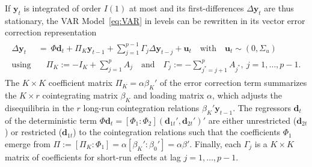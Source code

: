 If $ \boldsymbol{y}_{t} $ is integrated of order $ I(1) $ at most and its first-differences $ \Delta \boldsymbol{y}_{t} $ are thus stationary, the VAR Model~\eqref{eq:VAR} in levels can be rewritten in its vector error correction representation
\begin{align} \label{eq:VECM}
\begin{split}
	\Delta \boldsymbol{y}_{t} \ & = \ \Phi \boldsymbol{d}_{t} + \Pi_{K} \boldsymbol{y}_{t-1} + \sum_{j=1}^{p-1} \Gamma_{j} \Delta \boldsymbol{y}_{t-j} + \boldsymbol{u}_{t} \quad \textrm{with} \quad \boldsymbol{u}_{t} \sim (0,\Sigma_u)
	\\ \textrm{using} & \quad \Pi_{K} := -I_K+\sum_{j=1}^{p} A_j \quad \textrm{and} \quad \Gamma_j := -\sum_{j^*=j+1}^{p} A_{j^*}, \ j=1,\ldots,p-1.
\end{split}
\end{align}
The $ K \times K $ coefficient matrix $ \Pi_{K} = \alpha\beta_{K}' $ of the error correction term summarizes the \mbox{$ K \times r $} cointegrating matrix $ \beta_{K} $ and loading matrix $ \alpha $, which adjusts the disequilibria in the $ r $ long-run cointegration relations $ \beta_{K}' \boldsymbol{y}_{t-1} $. The regressors $ \boldsymbol{d}_{t} $ of the deterministic term $ \Phi \boldsymbol{d}_t = \left[ \Phi_1 : \Phi_{2} \right] \left( \boldsymbol{d}_{1t}', \boldsymbol{d}_{2t}' \right)' $ are either unrestricted ($ \boldsymbol{d}_{2t} $) or restricted ($ \boldsymbol{d}_{1t} $) to the cointegration relations such that the coefficients $ \Phi_1 $ emerge from $ \Pi := \left[ \Pi_{K} : \Phi_1 \right] = \alpha \left[ \beta_{K}' : \beta_0' \right] = \alpha \beta' $. Finally, each $ \Gamma_{j} $ is a $ K \times K $ matrix of coefficients for short-run effects at lag $ j=1,\ldots,p-1 $.


